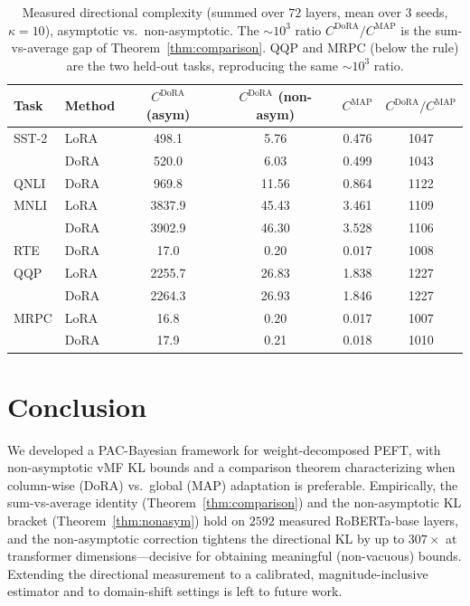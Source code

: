 \documentclass[11pt]{article}
\begin{document}
\begin{table}[t]
\centering
\caption{Measured directional complexity (summed over $72$ layers, mean over $3$
seeds, $\kappa{=}10$), asymptotic vs.\ non-asymptotic. The $\sim$$10^3$ ratio
$C^{\mathrm{DoRA}}/C^{\mathrm{MAP}}$ is the sum-vs-average gap of
Theorem~\ref{thm:comparison}. QQP and MRPC (below the rule) are the two held-out
tasks, reproducing the same $\sim$$10^3$ ratio.}
\label{tab:cterms}
\small
\begin{tabular}{llcccc}
\toprule
Task & Method & $C^{\mathrm{DoRA}}$ (asym) & $C^{\mathrm{DoRA}}$ (non-asym) & $C^{\mathrm{MAP}}$ & $C^{\mathrm{DoRA}}/C^{\mathrm{MAP}}$ \\
\midrule
SST-2 & LoRA & 498.1  & 5.76  & 0.476 & 1047 \\
      & DoRA & 520.0  & 6.03  & 0.499 & 1043 \\
QNLI  & DoRA & 969.8  & 11.56 & 0.864 & 1122 \\
MNLI  & LoRA & 3837.9 & 45.43 & 3.461 & 1109 \\
      & DoRA & 3902.9 & 46.30 & 3.528 & 1106 \\
RTE   & DoRA & 17.0   & 0.20  & 0.017 & 1008 \\
\midrule
QQP   & LoRA & 2255.7 & 26.83 & 1.838 & 1227 \\
      & DoRA & 2264.3 & 26.93 & 1.846 & 1227 \\
MRPC  & LoRA & 16.8   & 0.20  & 0.017 & 1007 \\
      & DoRA & 17.9   & 0.21  & 0.018 & 1010 \\
\bottomrule
\end{tabular}
\end{table}

\section{Conclusion}
We developed a PAC-Bayesian framework for weight-decomposed PEFT, with non-asymptotic
vMF KL bounds and a comparison theorem characterizing when column-wise (DoRA) vs.\
global (MAP) adaptation is preferable. Empirically, the sum-vs-average identity
(Theorem~\ref{thm:comparison}) and the non-asymptotic KL bracket
(Theorem~\ref{thm:nonasym}) hold on $2592$ measured RoBERTa-base layers, and the
non-asymptotic correction tightens the directional KL by up to $307\times$ at
transformer dimensions---decisive for obtaining meaningful (non-vacuous) bounds.
Extending the directional measurement to a calibrated, magnitude-inclusive estimator
and to domain-shift settings is left to future work.
\end{document}
